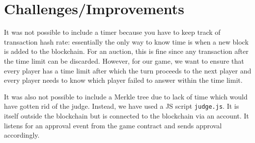 \documentclass{article}
\begin{document}
\section {Challenges/Improvements}
It was not possible to include a timer because you have to keep track of transaction hash rate: essentially the only way to know time is when a new block is added to the blockchain. For an auction, this is fine since any transaction after the time limit can be discarded. However, for our game, we want to ensure that every player has a time limit after which the turn proceeds to the next player and every player needs to know which player failed to answer within the time limit. 

It was also not possible to include a Merkle tree due to lack of time which would have gotten rid of the judge. Instead, we have used a JS script \verb|judge.js|. It is itself outside the blockchain but is connected to the blockchain via an account. It listens for an approval event from the game contract and sends approval accordingly.
\end{document}
